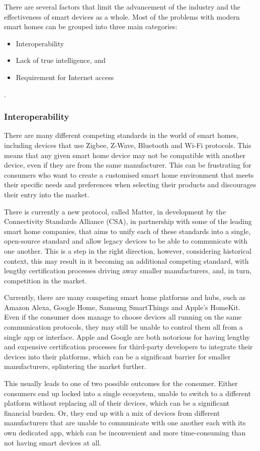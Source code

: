 There are several factors that limit the advancement of the industry and the effectiveness of smart devices as a whole.
Most of the problems with modern smart homes can be grouped into three main categories:
\begin{itemize}
    \item Interoperability
    \item Lack of true intelligence, and
    \item Requirement for Internet access
\end{itemize}
\cite{Wils15}.

\subsubsection{Interoperability}
There are many different competing standards in the world of smart homes, including devices that use Zigbee, Z-Wave, Bluetooth and Wi-Fi protocols.
This means that any given smart home device may not be compatible with another device, even if they are from the same manufacturer.
This can be frustrating for consumers who want to create a customised smart home environment that meets their specific needs and preferences when selecting their products and discourages their entry into the market.

There is currently a new protocol, called Matter, in development by the Connectivity Standards Alliance (CSA), in partnership with some of the leading smart home companies, that aims to unify each of these standards into a single, open-source standard and allow legacy devices to be able to communicate with one another.
This is a step in the right direction, however, considering historical context, this may result in it becoming an additional competing standard, with lengthy certification processes driving away smaller manufacturers, and, in turn, competition in the market.

Currently, there are many competing smart home platforms and hubs, such as Amazon Alexa, Google Home, Samsung SmartThings and Apple's HomeKit.
Even if the consumer does manage to choose devices all running on the same communication protocols, they may still be unable to control them all from a single app or interface.
Apple and Google are both notorious for having lengthy and expensive certification processes for third-party developers to integrate their devices into their platforms, which can be a significant barrier for smaller manufacturers, splintering the market further.

This usually leads to one of two possible outcomes for the consumer.
Either consumers end up locked into a single ecosystem, unable to switch to a different platform without replacing all of their devices, which can be a significant financial burden.
Or, they end up with a mix of devices from different manufacturers that are unable to communicate with one another each with its own dedicated app, which can be inconvenient and more time-consuming than not having smart devices at all.

